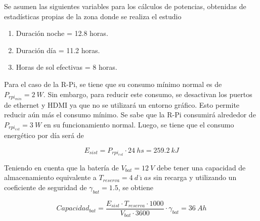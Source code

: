 
Se asumen las siguientes variables para los cálculos de potencias, obtenidas de estadísticas propias de la zona donde se realiza el estudio \cite{ref:weather_bariloche}
\begin{enumerate}
	\item Duración noche = 12.8 horas.
	\item Duración día = 11.2 horas.
	\item Horas de sol efectivas = 8 horas.
\end{enumerate}

Para el caso de la R-Pi, se tiene que su consumo mínimo normal es de $P_{rpi_{min}} = 2 \ W$. Sin embargo, para reducir este consumo, se desactivan los puertos de ethernet y HDMI ya que no se utilizará un entorno gráfico. Esto permite reducir aún más el consumo mínimo. Se sabe que la R-Pi consumirá alrededor de $P_{rpi_{est}} = 3 \ W$ en su funcionamiento normal.
Luego, se tiene que el consumo energético por día será de

\begin{equation}
E_{sist} = P_{rpi_{est}}\cdot 24 \ hs = 259.2 \ kJ
\end{equation}



Teniendo en cuenta que la batería de $V_{bat} = 12 \ V$ debe tener una capacidad de almacenamiento equivalente a $T_{reserva} = 4 \ d\acute{\imath}as$ sin recarga \cite{ref:weather_bariloche} y utilizando un coeficiente de seguridad de $\gamma_{bat} = 1.5$, se obtiene

\begin{equation}
Capacidad_{bat} = \frac{E_{sist}\cdot T_{reserva}\cdot 1000}{V_{bat}\cdot 3600}\cdot \gamma_{bat} = 36 \ Ah
\end{equation}

